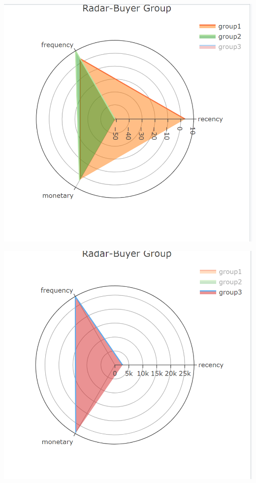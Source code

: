 \documentclass[
  11pt,
]{article}
\begin{document}
\includegraphics{img/radar1.png}

\includegraphics{img/radar2.png}
\end{document}
